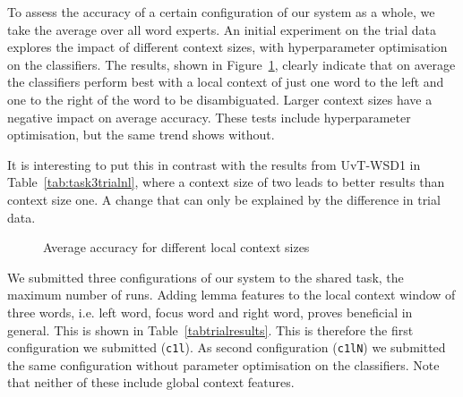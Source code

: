 To assess the accuracy of a certain configuration of our system as a whole, we
take the average over all word experts. An initial experiment on the trial data
explores the impact of different context sizes, with hyperparameter
optimisation on the classifiers. The results, shown in Figure~\ref{figcontext},
clearly indicate that on average the classifiers perform best with a local
context of just one word to the left and one to the right of the word to be
disambiguated. Larger context sizes have a negative impact on average accuracy.
These tests include hyperparameter optimisation, but the same trend shows
without.

It is interesting to put this in contrast with the results from UvT-WSD1 in
Table~\ref{tab:task3trialnl}, where a context size of two leads to better
results than context size one.  A change that can only be explained by the
difference in trial data. %

\begin{figure}[t]
\noindent{}
\caption{Average accuracy for different local context sizes}
\label{figcontext}
\end{figure}

We submitted three configurations of our system to the shared task, the maximum
number of runs. Adding lemma features to the local context window of three
words, i.e. left word, focus word and right word, proves beneficial in general.
This is shown in Table~\ref{tabtrialresults}.  This is therefore the first
configuration we submitted (\texttt{c1l}). As second configuration
(\texttt{c1lN}) we submitted the same configuration without parameter
optimisation on the classifiers. Note that neither of these include global
context features.

